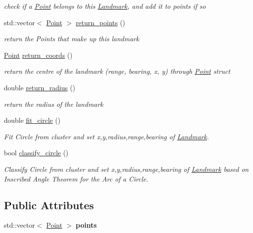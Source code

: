 \begin{DoxyCompactItemize}
\begin{DoxyCompactList}\small\item\em check if a \hyperlink{structnuslam_1_1Point}{Point} belongs to this \hyperlink{classnuslam_1_1Landmark}{Landmark}, and add it to points if so \end{DoxyCompactList}\item 
std\+::vector$<$ \hyperlink{structnuslam_1_1Point}{Point} $>$ \hyperlink{classnuslam_1_1Landmark_abe1f30f91e48914c4ecddc5aad06754f}{return\+\_\+points} ()
\begin{DoxyCompactList}\small\item\em return the Points that make up this landmark \end{DoxyCompactList}\item 
\hyperlink{structnuslam_1_1Point}{Point} \hyperlink{classnuslam_1_1Landmark_a15b17b9758ceb73359a0d880c9e186d9}{return\+\_\+coords} ()
\begin{DoxyCompactList}\small\item\em return the centre of the landmark (range, bearing, x, y) through \hyperlink{structnuslam_1_1Point}{Point} struct \end{DoxyCompactList}\item 
double \hyperlink{classnuslam_1_1Landmark_a298ca8852eb6bfeb414eee3e17bc2de8}{return\+\_\+radius} ()
\begin{DoxyCompactList}\small\item\em return the radius of the landmark \end{DoxyCompactList}\item 
double \hyperlink{classnuslam_1_1Landmark_a9279c2d247c718c39de112b5d655f2f9}{fit\+\_\+circle} ()
\begin{DoxyCompactList}\small\item\em Fit Circle from cluster and set x,y,radius,range,bearing of \hyperlink{classnuslam_1_1Landmark}{Landmark}. \end{DoxyCompactList}\item 
bool \hyperlink{classnuslam_1_1Landmark_a3b7ac8453027ee8e486d9926dfb639d2}{classify\+\_\+circle} ()
\begin{DoxyCompactList}\small\item\em Classify Circle from cluster and set x,y,radius,range,bearing of \hyperlink{classnuslam_1_1Landmark}{Landmark} based on Inscribed Angle Theorem for the Arc of a Circle. \end{DoxyCompactList}\end{DoxyCompactItemize}
\subsection*{Public Attributes}
\begin{DoxyCompactItemize}
\item 
\mbox{\label{classnuslam_1_1Landmark_acc5443b3c03dd8d2ed4b2e9c5b49d464}} 
std\+::vector$<$ \hyperlink{structnuslam_1_1Point}{Point} $>$ {\bfseries points}
\end{DoxyCompactItemize}


